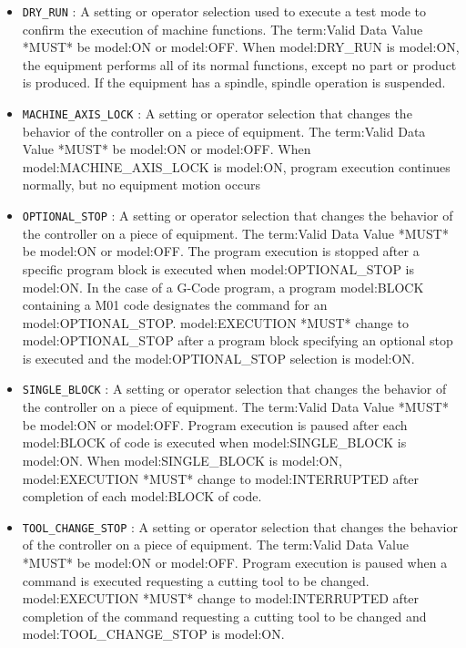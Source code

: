 \begin{itemize}
\item \texttt{DRY_RUN} : A setting or operator selection used to execute a test mode to confirm the execution of machine functions. 
 The {term:Valid Data Value} *MUST* be {model:ON} or {model:OFF}. 
 When {model:DRY_RUN} is {model:ON}, the equipment performs all of its normal functions, except no part or product is produced.  If the equipment has a spindle, spindle operation is suspended.

\item \texttt{MACHINE_AXIS_LOCK} : A setting or operator selection that changes the behavior of the controller on a piece of equipment. 
 The {term:Valid Data Value} *MUST* be {model:ON} or {model:OFF}. 
 When {model:MACHINE_AXIS_LOCK} is {model:ON}, program execution continues normally, but no equipment motion occurs 

\item \texttt{OPTIONAL_STOP} : A setting or operator selection that changes the behavior of the controller on a piece of equipment. 
 The {term:Valid Data Value} *MUST* be {model:ON} or {model:OFF}.
 The program execution is stopped after a specific program block is executed when {model:OPTIONAL_STOP} is {model:ON}.    
 In the case of a G-Code program, a program {model:BLOCK} containing a M01 code designates the command for an {model:OPTIONAL_STOP}. 
 {model:EXECUTION} *MUST* change to {model:OPTIONAL_STOP} after a program block specifying an optional stop is executed and the {model:OPTIONAL_STOP} selection is {model:ON}.

\item \texttt{SINGLE_BLOCK} : A setting or operator selection that changes the behavior of the controller on a piece of equipment. 
 The {term:Valid Data Value} *MUST* be {model:ON} or {model:OFF}.
 Program execution is paused after each {model:BLOCK} of code is executed when {model:SINGLE_BLOCK} is {model:ON}.   
 When {model:SINGLE_BLOCK} is {model:ON}, {model:EXECUTION} *MUST* change to {model:INTERRUPTED} after completion of each {model:BLOCK} of code. 

\item \texttt{TOOL_CHANGE_STOP} : A setting or operator selection that changes the behavior of the controller on a piece of equipment. 
 The {term:Valid Data Value} *MUST* be {model:ON} or {model:OFF}. 
 Program execution is paused when a command is executed requesting a cutting tool to be changed. 
 {model:EXECUTION} *MUST* change to {model:INTERRUPTED} after completion of the command requesting a cutting tool to be changed and {model:TOOL_CHANGE_STOP} is {model:ON}.

\end{itemize}

